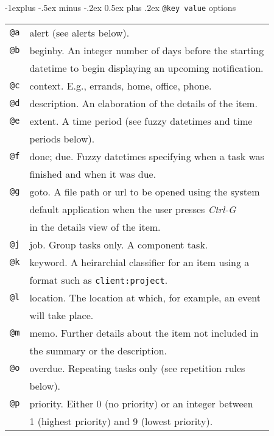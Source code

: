 \documentclass[9pt,landscape]{article}
\makeatletter
\renewcommand{\subsection}{\@startsection{subsection}{2}{0mm}%
                                {-1explus -.5ex minus -.2ex}%
                                {0.5ex plus .2ex}%
                                {\normalfont\normalsize\bfseries}}
\makeatother
\begin{document}
\begin{multicols}{3}
\subsection{\texttt{@key value} options}
\newlength{\MyLen}
\begin{tabular}{@{}ll@{}}
\texttt{@a} & alert (see alerts below). \\
\texttt{@b} & beginby. An integer number of days before the starting \\
            & datetime to begin displaying an upcoming notification. \\
\texttt{@c} & context. E.g., errands, home, office, phone. \\
\texttt{@d} & description. An elaboration of the details of the item. \\
\texttt{@e} & extent. A time period (see fuzzy datetimes and time \\
            & periods below).\\
\texttt{@f} & done; due. Fuzzy datetimes specifying when a task was \\
            & finished and when it was due. \\
\texttt{@g} & goto. A file path or url to be opened using the system \\
            & default application when the user presses \emph{Ctrl-G} \\
            & in the details view of the item. \\
\texttt{@j} & job. Group tasks only. A component task. \\
\texttt{@k} & keyword. A heirarchial classifier for an item using a \\
            & format such as \texttt{client:project}. \\
\texttt{@l} & location. The location at which, for example, an event \\
            & will take place. \\
\texttt{@m} & memo. Further details about the item not included in \\
            & the summary or the description. \\
\texttt{@o} & overdue. Repeating tasks only (see repetition rules \\
            & below). \\
\texttt{@p} & priority. Either 0 (no priority) or an integer between \\
            & 1 (highest priority) and 9 (lowest priority). \\
\end{tabular}


\end{multicols}
\end{document}
